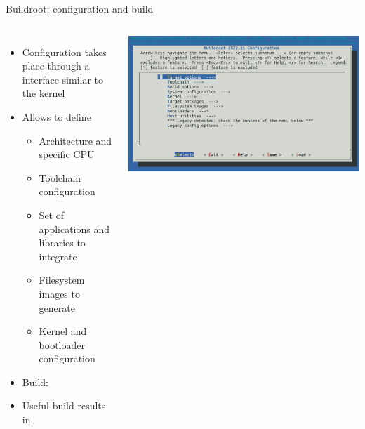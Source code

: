 \begin{frame}{Buildroot: configuration and build}
  \begin{columns}
    \begin{itemize}
    \item Configuration takes place through a  interface similar to the
      kernel\\
    \item Allows to define
      \begin{itemize}
      \item Architecture and specific CPU
      \item Toolchain configuration
      \item Set of applications and libraries to integrate
      \item Filesystem images to generate
      \item Kernel and bootloader configuration
      \end{itemize}
    \item Build:\\
    \item Useful build results in 
    \end{itemize}
    \includegraphics[width=\textwidth]{slides/sysdev-build-systems/buildroot-screenshot.png}
  \end{columns}
\end{frame}

